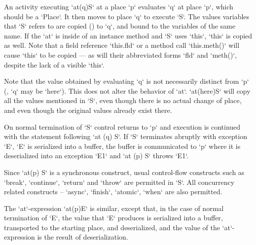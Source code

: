 An activity executing \xcd`at(q)S` at a place \xcd`p` evaluates \xcd`q` at
place \xcd`p`, which should be a \xcd`Place`.  It then moves to place \xcd`q`
to execute \xcd`S`.  The values variables that \xcd`S` refers to are copied
() to \xcd`q`, and bound to the variables of the same
name.   If the \xcd`at` is inside of an instance method and \xcd`S` uses
\xcd`this`, \xcd`this` is copied as well.  Note that a field reference
\xcd`this.fld` or a method call \xcd`this.meth()` will cause \xcd`this` to be
copied --- as will their abbreviated forms \xcd`fld` and \xcd`meth()`, despite
the lack of a visible \xcd`this`.  


Note that the value obtained by evaluating \xcd`q`
is not necessarily distinct from \xcd`p` (\eg, \xcd`q` may be
\xcd`here`). 
This does not alter the behavior of \xcd`at`.  
\xcd`at(here)S` will copy all the values mentioned in \xcd`S`, even though
there is no actual change of place, and even though the original values
already exist there. 

On normal termination of \xcd`S` control returns to \xcd`p` and
execution is continued with the statement following 
\xcd`at (q) S`. 
If
\xcd`S` terminates abruptly with exception \xcd`E`, \xcd`E` is
serialized into a buffer, the buffer is communicated to \xcd`p` where
it is deserialized into an exception \xcd`E1` and \xcd`at (p) S`
throws \xcd`E1`.

Since 
\xcd`at(p) S` 
is a synchronous construct, usual control-flow
constructs such as \xcd`break`, \xcd`continue`, \xcd`return` and 
\xcd`throw` are permitted in \xcd`S`.  All concurrency related
constructs -- \xcd`async`, \xcd`finish`, \xcd`atomic`, \xcd`when` are
also permitted.

The \xcd`at`-expression 
\xcd`at(p)E` 
is similar, except that, in the case of
normal termination of \xcd`E`, the value that \xcd`E` produces is serialized
into a buffer, transported to the starting place, and deserialized, and the
value of the \xcd`at`-expression is the result of deserialization.




